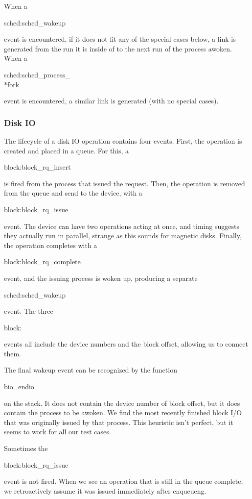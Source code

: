 \documentclass[10pt]{article}
\begin{document}
When a \begin{tt}sched:sched\_wakeup\end{tt} event is encountered, if it does not fit any of the special cases below, a link is generated from the run it is inside of to the next run of the process awoken.  When a \begin{tt}sched:sched\_process\_\\*fork\end{tt} event is encountered, a similar link is generated (with no special cases).

\subsubsection{Disk IO}

The lifecycle of a disk IO operation contains four events.  First, the operation is created and placed in a queue.  For this, a \begin{tt}block:block\_rq\_insert\end{tt} is fired from the process that issued the request.  Then, the operation is removed from the queue and send to the device, with a \begin{tt}block:block\_rq\_issue\end{tt} event.  The device can have two operations acting at once, and timing suggests they actually run in parallel, strange as this sounds for magnetic disks.  Finally, the operation completes with a \begin{tt}block:block\_rq\_complete\end{tt} event, and the issuing process is woken up, producing a separate \begin{tt}sched:sched\_wakeup\end{tt} event.  The three \begin{tt}block:\end{tt} events all include the device numbers and the block offset, allowing us to connect them.

The final wakeup event can be recognized by the function \begin{tt}bio\_endio\end{tt} on the stack.  It does not contain the device number of block offset, but it does contain the process to be awoken.  We find the most recently finished block I/O that was originally issued by that process.  This heuristic isn't perfect, but it seems to work for all our test cases.

Sometimes the \begin{tt}block:block\_rq\_issue\end{tt} event is not fired.  When we see an operation that is still in the queue complete, we retroactively assume it was issued immediately after enqueueng.
\end{document}
